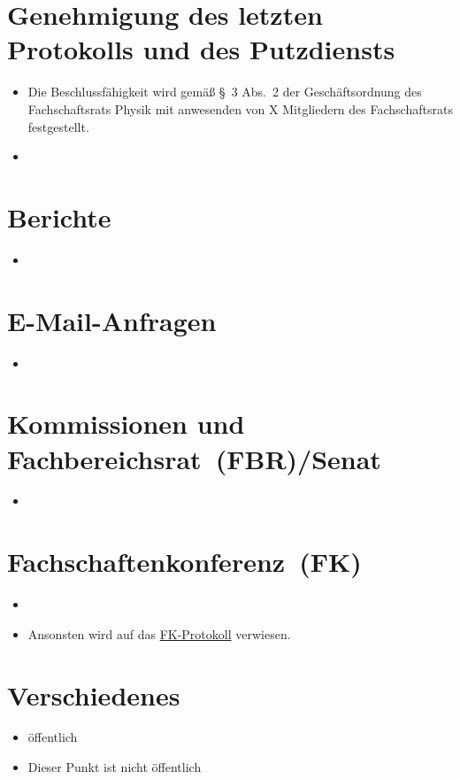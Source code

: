 \documentclass[sitzung=fsr,entwurf]{fsphys-protokoll}
\begin{document}
\section{Genehmigung des letzten Protokolls und des Putzdiensts}
\begin{itemize}
	\item Die Beschlussfähigkeit wird gemäß §~3 Abs.~2 der Geschäftsordnung des Fachschaftsrats Physik mit {\protokollanzahlanwesend} anwesenden von X Mitgliedern des Fachschaftsrats festgestellt.
	\item 
\end{itemize}

\section{Berichte}
\begin{itemize}
	\item 
\end{itemize}

\section{E-Mail-Anfragen}
\begin{itemize}
	\item 
\end{itemize}

\section{Kommissionen und Fachbereichsrat~(FBR)/Senat}
\begin{itemize}
	\item 
\end{itemize}

\section{Fachschaftenkonferenz~(FK)}
\begin{itemize}
	\item 
	\item Ansonsten wird auf das \href{https://www.asta.ms/fachschaftenportal#fkprotokolle}{FK-Protokoll} verwiesen.
\end{itemize}

\section{Verschiedenes}
\begin{itemize}
	\item öffentlich
\end{itemize}
	\begin{nichtoeffentlich}
  \begin{itemize}
      \item Dieser Punkt ist nicht öffentlich
  \end{itemize}
\end{nichtoeffentlich}
\end{document}
